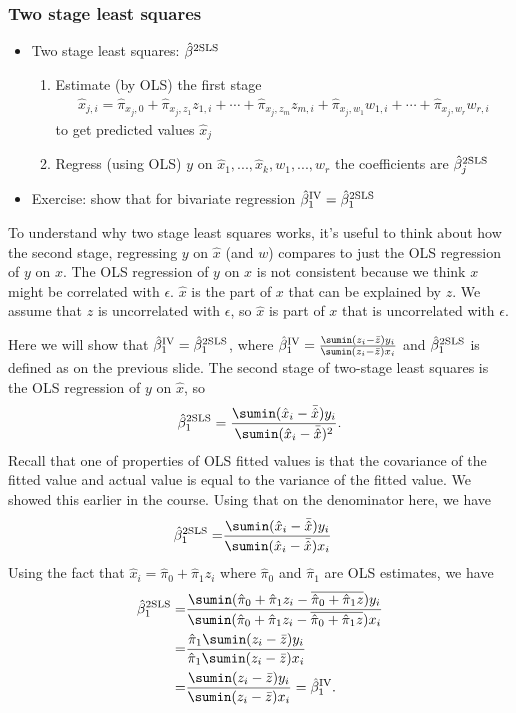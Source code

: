 \begin{frame}[allowframebreaks]\frametitle{Two stage least squares}
  \begin{itemize}
  \item \alert{Two stage least squares}: ${\hat{\beta}^{\mathrm{2SLS}}}$
    \begin{enumerate}
    \item Estimate (by OLS) the first stage
      {\footnotesize
      \begin{align*}
        \hat{x}_{j,i} = \hat{\pi}_{x_j,0} + \hat{\pi}_{x_j,z_1} z_{1,i} +
        \cdots + \hat{\pi}_{x_j,z_m} z_{m,i} + \hat{\pi}_{x_j,w_1} w_{1,i} +
        \cdots + \hat{\pi}_{x_j,w_r} w_{r,i}
      \end{align*}}
      to get predicted values $\hat{x}_j$
    \item Regress (using OLS) $y$ on $\hat{x}_1, ..., \hat{x}_k, w_1, ..., w_r$
      the coefficients are ${\hat{\beta}^{\mathrm{2SLS}}}_j$
    \end{enumerate}
  \item Exercise: show that for bivariate regression ${\hat{\beta}^{\mathrm{IV}}}_1 = {\hat{\beta}^{\mathrm{2SLS}}}_1$
  \end{itemize}
\end{frame}

To understand why two stage least squares works, it's useful to think
about how the second stage, regressing $y$ on $\hat{x}$ (and $w$) compares to
just the OLS regression of $y$ on $x$. The OLS regression of $y$ on
$x$ is not consistent because we think $x$ might be correlated with
$\epsilon$. $\hat{x}$ is the part of $x$ that can be explained by
$z$. We assume that $z$ is uncorrelated with $\epsilon$, so $\hat{x}$
is part of $x$ that is uncorrelated with $\epsilon$. 

Here we will show that ${\hat{\beta}^{\mathrm{IV}}}_1 = {\hat{\beta}^{\mathrm{2SLS}}}_1$, where $\biv_1 =
\frac{\sumin (z_i - \bar{z}) y_i}{\sumin (z_i - \bar{z}) x_i}$ and
${\hat{\beta}^{\mathrm{2SLS}}}_1$ is defined as on the previous slide. The second stage of
two-stage least squares is the OLS regression of $y$ on $\hat{x}$, so
\[ \btsls_1 = \frac{ \sumin (\hat{x}_i - \bar{\hat{x}}) y_i} {\sumin
    (\hat{x}_i - \bar{\hat{x}})^2 }. \] 
Recall that one of properties of OLS fitted values is that the
covariance of the fitted value and actual value is equal to the
variance of the fitted value. We showed this earlier in the
course. Using that on the denominator here, we have
\begin{align*}
\btsls_1 = & \frac{ \sumin (\hat{x}_i - \bar{\hat{x}}) y_i} {\sumin
             (\hat{x}_i - \bar{\hat{x}})x_i }  
\end{align*}
Using the fact that $\hat{x}_i = \hat{\pi}_0 + \hat{\pi}_1 z_i$ where
$\hat{\pi}_0$ and $\hat{\pi}_1$ are OLS estimates, we have
\begin{align*}
\btsls_1 = & \frac{ \sumin (\hat{\pi}_0 + \hat{\pi}_1 z_i -
             \overline{\hat{\pi}_0 + \hat{\pi}_1 z}) y_i} 
             {\sumin (\hat{\pi}_0 + \hat{\pi}_1 z_i -
             \overline{\hat{\pi}_0 + \hat{\pi}_1 z})x_i } \\
  = & \frac{ \hat{\pi}_1 \sumin (z_i - \bar{z})y_i}
      {\hat{\pi}_1 \sumin (z_i -\bar{z})x_i } \\
  = & \frac{\sumin (z_i - \bar{z}) y_i}{\sumin (z_i - \bar{z}) x_i} =
      \biv_1. 
\end{align*}


